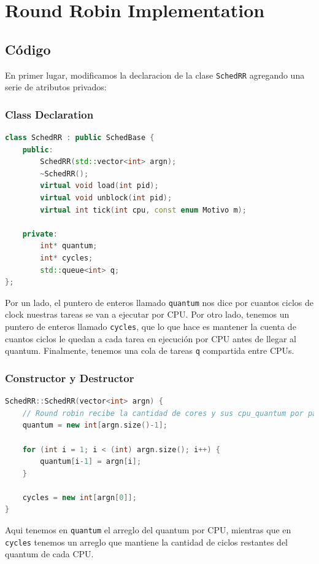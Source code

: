 \section{Round Robin Implementation}

\subsection{Código}

En primer lugar, modificamos la declaracion de la clase  \texttt{SchedRR} agregando una serie de atributos privados:

\subsubsection{Class Declaration}
\begin{lstlisting}[language=C++, breaklines=true]
class SchedRR : public SchedBase {
	public:
		SchedRR(std::vector<int> argn);
        ~SchedRR();
		virtual void load(int pid);
		virtual void unblock(int pid);
		virtual int tick(int cpu, const enum Motivo m);

	private:
		int* quantum;
		int* cycles;
		std::queue<int> q;
};
\end{lstlisting}

Por un lado, el puntero de enteros llamado \texttt{quantum} nos dice por cuantos ciclos de clock nuestras tareas se van a ejecutar por CPU. Por otro lado, tenemos un puntero de enteros llamado \texttt{cycles}, que lo que hace es mantener la cuenta de cuantos ciclos le quedan a cada tarea en ejecución por CPU antes de llegar al quantum. Finalmente, tenemos una cola de tareas \texttt{q} compartida entre CPUs.

\subsubsection{Constructor y Destructor}
\begin{lstlisting}[language=C++, breaklines=true]
SchedRR::SchedRR(vector<int> argn) {
	// Round robin recibe la cantidad de cores y sus cpu_quantum por parametro
	quantum = new int[argn.size()-1];

	for (int i = 1; i < (int) argn.size(); i++) {
		quantum[i-1] = argn[i];
	}

	cycles = new int[argn[0]];
}
\end{lstlisting}

Aqui tenemos en \texttt{quantum} el arreglo del quantum por CPU, mientras que en \texttt{cycles} tenemos un arreglo que mantiene la cantidad de ciclos restantes del quantum de cada CPU.

